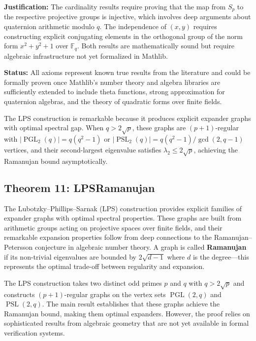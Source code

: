 \documentclass[11pt]{article}
\theoremstyle{plain}
\theoremstyle{definition}
\theoremstyle{remark}
\begin{document}
\textbf{Justification:} The cardinality results require proving that the map from $S_p$ to the respective projective groups is injective, which involves deep arguments about quaternion arithmetic modulo $q$. The independence of $(x,y)$ requires constructing explicit conjugating elements in the orthogonal group of the norm form $x^2 + y^2 + 1$ over $\mathbb{F}_q$. Both results are mathematically sound but require algebraic infrastructure not yet formalized in Mathlib.

\textbf{Status:} All axioms represent known true results from the literature and could be formally proven once Mathlib's number theory and algebra libraries are sufficiently extended to include theta functions, strong approximation for quaternion algebras, and the theory of quadratic forms over finite fields.

The LPS construction is remarkable because it produces explicit expander graphs with optimal spectral gap. When $q > 2\sqrt{p}$, these graphs are $(p+1)$-regular with $|\operatorname{PGL}_2(q)| = q(q^2-1)$ or $|\operatorname{PSL}_2(q)| = q(q^2-1)/\gcd(2,q-1)$ vertices, and their second-largest eigenvalue satisfies $\lambda_2 \leq 2\sqrt{p}$, achieving the Ramanujan bound asymptotically.

\vspace{1em}

\subsection{Theorem 11: LPSRamanujan}

The Lubotzky--Phillips--Sarnak (LPS) construction provides explicit families of expander graphs with optimal spectral properties. These graphs are built from arithmetic groups acting on projective spaces over finite fields, and their remarkable expansion properties follow from deep connections to the Ramanujan--Petersson conjecture in algebraic number theory. A graph is called \textbf{Ramanujan} if its non-trivial eigenvalues are bounded by $2\sqrt{d-1}$ where $d$ is the degree---this represents the optimal trade-off between regularity and expansion.

The LPS construction takes two distinct odd primes $p$ and $q$ with $q > 2\sqrt{p}$ and constructs $(p+1)$-regular graphs on the vertex sets $\operatorname{PGL}(2,q)$ and $\operatorname{PSL}(2,q)$. The main result establishes that these graphs achieve the Ramanujan bound, making them optimal expanders. However, the proof relies on sophisticated results from algebraic geometry that are not yet available in formal verification systems.
\end{document}
